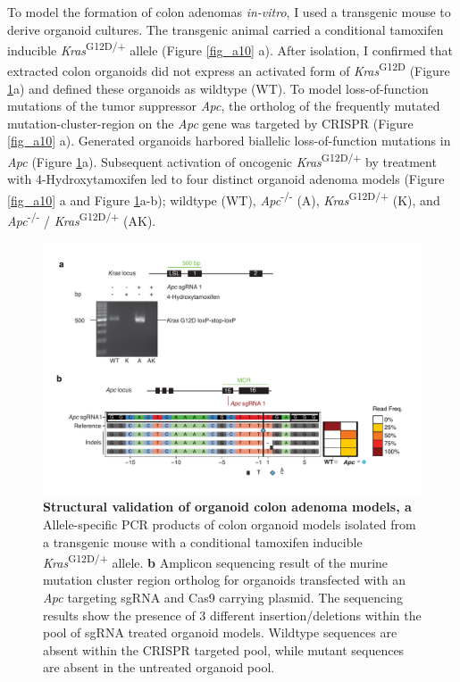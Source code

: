 \begin{flushleft}
To model the formation of colon adenomas \textit{in-vitro}, I used a transgenic mouse to derive organoid cultures. The transgenic animal carried a conditional tamoxifen inducible \textit{Kras}\textsuperscript{G12D/+} allele \citep{jacksonAnalysisLungTumor2001} (Figure \ref{fig_a10} a). After isolation, I confirmed that extracted colon organoids did not express an activated form of \textit{Kras}\textsuperscript{G12D} (Figure \ref{fig_a11}a) and defined these organoids as wildtype (WT). To model loss-of-function mutations of the tumor suppressor \textit{Apc}, the ortholog of the frequently mutated mutation-cluster-region on the \textit{Apc} gene was targeted by CRISPR (Figure \ref{fig_a10} a). Generated organoids harbored biallelic loss-of-function mutations in \textit{Apc} (Figure \ref{fig_a11}a). Subsequent activation of oncogenic \textit{Kras}\textsuperscript{G12D/+} by treatment with 4-Hydroxytamoxifen led to four distinct organoid adenoma models (Figure \ref{fig_a10} a and Figure \ref{fig_a11}a-b); wildtype (WT), \textit{Apc}\textsuperscript{-/-}
  (A), \textit{Kras}\textsuperscript{G12D/+} (K), and \textit{Apc}\textsuperscript{-/-} / \textit{Kras}\textsuperscript{G12D/+} (AK).


\begin{figure}[h]
\centering
\includegraphics[width=\textwidth,
                height=\textheight,
                keepaspectratio]{figures/adenomaprofiling/pdf/fig_1_1.pdf}
\caption[Structural validation of organoid colon adenoma models]{\textbf{Structural validation of organoid colon adenoma models, a} Allele-specific PCR products of colon organoid models isolated from a transgenic mouse with a conditional tamoxifen inducible \textit{Kras}\textsuperscript{G12D/+} allele.
\textbf{b} Amplicon sequencing result of the murine mutation cluster region ortholog for organoids transfected with an \textit{Apc} targeting sgRNA and Cas9 carrying plasmid. The sequencing results show the presence of 3 different insertion/deletions within the pool of sgRNA treated organoid models. Wildtype sequences are absent within the CRISPR targeted pool, while mutant sequences are absent in the untreated organoid pool.}
\label{fig_a11}
\end{figure}
\bigbreak


\end{flushleft}
